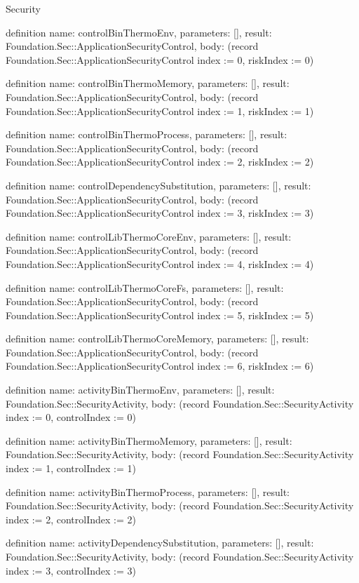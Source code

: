 \begin{lexlean}{Security}
\begin{semanticmodule}
definition{
  name: controlBinThermoEnv,
  parameters: [],
  result: Foundation.Sec::ApplicationSecurityControl,
  body: (record Foundation.Sec::ApplicationSecurityControl {index := 0, riskIndex := 0})
}

definition{
  name: controlBinThermoMemory,
  parameters: [],
  result: Foundation.Sec::ApplicationSecurityControl,
  body: (record Foundation.Sec::ApplicationSecurityControl {index := 1, riskIndex := 1})
}

definition{
  name: controlBinThermoProcess,
  parameters: [],
  result: Foundation.Sec::ApplicationSecurityControl,
  body: (record Foundation.Sec::ApplicationSecurityControl {index := 2, riskIndex := 2})
}

definition{
  name: controlDependencySubstitution,
  parameters: [],
  result: Foundation.Sec::ApplicationSecurityControl,
  body: (record Foundation.Sec::ApplicationSecurityControl {index := 3, riskIndex := 3})
}

definition{
  name: controlLibThermoCoreEnv,
  parameters: [],
  result: Foundation.Sec::ApplicationSecurityControl,
  body: (record Foundation.Sec::ApplicationSecurityControl {index := 4, riskIndex := 4})
}

definition{
  name: controlLibThermoCoreFs,
  parameters: [],
  result: Foundation.Sec::ApplicationSecurityControl,
  body: (record Foundation.Sec::ApplicationSecurityControl {index := 5, riskIndex := 5})
}

definition{
  name: controlLibThermoCoreMemory,
  parameters: [],
  result: Foundation.Sec::ApplicationSecurityControl,
  body: (record Foundation.Sec::ApplicationSecurityControl {index := 6, riskIndex := 6})
}

definition{
  name: activityBinThermoEnv,
  parameters: [],
  result: Foundation.Sec::SecurityActivity,
  body: (record Foundation.Sec::SecurityActivity {index := 0, controlIndex := 0})
}

definition{
  name: activityBinThermoMemory,
  parameters: [],
  result: Foundation.Sec::SecurityActivity,
  body: (record Foundation.Sec::SecurityActivity {index := 1, controlIndex := 1})
}

definition{
  name: activityBinThermoProcess,
  parameters: [],
  result: Foundation.Sec::SecurityActivity,
  body: (record Foundation.Sec::SecurityActivity {index := 2, controlIndex := 2})
}

definition{
  name: activityDependencySubstitution,
  parameters: [],
  result: Foundation.Sec::SecurityActivity,
  body: (record Foundation.Sec::SecurityActivity {index := 3, controlIndex := 3})
}


\end{semanticmodule}
\end{lexlean}
